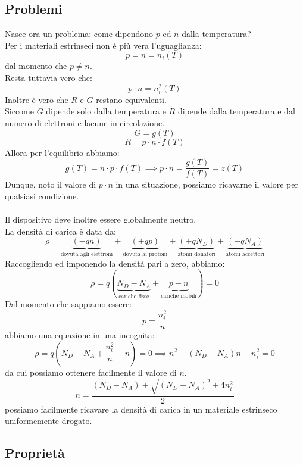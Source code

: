 \documentclass[../main.tex]{subfiles}
\begin{document}
	\subsection{Problemi}
	Nasce ora un problema: come dipendono $p$ ed $n$ dalla temperatura? \\
	Per i materiali estrinseci non è più vera l’uguaglianza:
	$$p = n = n_i(T)$$
	dal momento che $p \neq n$.\\
	 Resta tuttavia vero che:
	$$p \cdot n = n_i^2(T)$$
	Inoltre è vero che $R$ e $G$ restano equivalenti. \\
	Siccome $G$ dipende solo dalla temperatura e $R$ dipende dalla temperatura e dal numero di elettroni e lacune in circolazione.
	$$G = g(T)$$
	$$R = p \cdot n \cdot f(T)$$
	Allora per l’equilibrio abbiamo:
	$$g(T) = n \cdot p \cdot f(T) \implies p \cdot n = \frac{g(T)}{f(T)} = z(T)$$
	Dunque, noto il valore di $p \cdot n$ in una situazione, possiamo ricavarne il valore per qualsiasi condizione.\\\\
	Il dispositivo deve inoltre essere globalmente neutro. \\
	La densità di carica è data da:
	$$\rho = \underbrace{(-qn)}_{\text{dovuta agli elettroni}} + \underbrace{(+qp)}_{\text{dovuta ai protoni}} + \underbrace{(+qN_D)}_{\text{atomi donatori}} + \underbrace{(-qN_A)}_{\text{atomi accettori}}$$
	Raccogliendo ed imponendo la densità pari a zero, abbiamo:
	$$\rho = q \left( \underbrace{N_D - N_A}_{\text{cariche fisse}} + \underbrace{p - n}_{\text{cariche mobili}} \right) = 0$$
	Dal momento che sappiamo essere:
	$$p = \frac{n_i^2}{n}$$
	abbiamo una equazione in una incognita:
	$$\rho = q\left(N_D - N_A + \frac{n_i^2}{n} - n\right) = 0 \implies n^2 - (N_D - N_A)n - n_i^2 = 0$$
	da cui possiamo ottenere facilmente il valore di $n$.
	$$n = \frac{(N_D - N_A) + \sqrt{(N_D - N_A)^2 + 4n_i^2}}{2}$$
	possiamo facilmente ricavare la densità di carica in un materiale estrinseco uniformemente drogato.
	\subsection{Proprietà}
\end{document}
